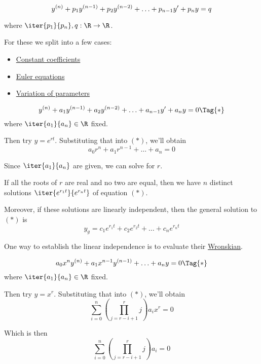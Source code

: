 
\begin{equation*}\def\y#1{y^{(#1)}}
  \y n+p_1\y{n-1}+p_2\y{n-2}+\ldots+p_{n-1}y'+p_ n y=q
\end{equation*}

where $\iter{p_1}{p_n},q:\R\to\R$.

For these we split into a few cases:
\begin{itemize}
  \item\href{cd8a29a}{Constant coefficients}
  \item\href{a0f8e0c}{Euler equations}
  \item\href{de785b7}{Variation of parameters}
\end{itemize}

\label{cd8a29a}

\begin{equation*}\def\y#1{y^{(#1)}}
  \y n+a_1\y{n-1}+a_2\y{n-2}+\ldots+a_{n-1}y'+a_ny=0\Tag{*}
\end{equation*}
where $\iter{a_1}{a_n}\in\R$ fixed.

Then try $y=e^{rt}$. Substituting that into $(*)$, we'll obtain
$$a_0r^n+a_1r^{n-1}+\ldots+a_n=0$$

Since $\iter{a_1}{a_n}$ are given, we can solve for $r$.

If all the roots of $r$ are real and no two are equal, then we have $n$
distinct solutions $\iter{e^{r_1t}}{e^{r_nt}}$ of equation $(*)$.

Moreover, if these solutions are linearly independent, then the general
solution to $(*)$ is
$$y_g=c_1e^{r_1t}+c_2e^{r_2t}+\ldots+c_ne^{r_nt}$$

One way to establish the linear independence is to evaluate their
\href{b70073b}{Wronskian}.

\label{a0f8e0c}

\begin{equation*}\def\y#1{x^{#1}y^{(#1)}}
  a_0\y{n}+a_1\y{n-1}+\ldots+a_ny=0\Tag{*}
\end{equation*}
where $\iter{a_1}{a_n}\in\R$ fixed.

Then try $y=x^{r}$. Substituting that into $(*)$, we'll obtain
$$
  \sum_{i=0}^n\left(\prod_{j=r-i+1}^rj\right) a_ix^r=0
$$

Which is then
$$
  \sum_{i=0}^n\left(\prod_{j=r-i+1}^rj\right) a_i=0
$$

\label{de785b7}

